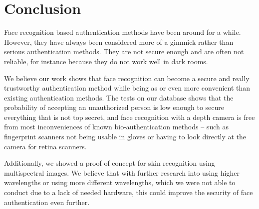 \chapter{Conclusion}
    Face recognition based authentication methods have been around for a while. However,
    they have always been considered more of a gimmick rather than serious
    authentication methods. They are not secure enough and are often not reliable,
    for instance because they do not work well in dark rooms.

    We believe our work shows that face recognition can become a secure and
    really trustworthy authentication method while being as or even more
    convenient than existing authentication methods.
    The tests on our database shows that the probability of accepting
    an unauthorized person is low enough to secure everything that is not top secret,
    and face recognition with a depth camera is free from most inconveniences
    of known bio-authentication methods -- such as fingerprint scanners not
    being usable in gloves or having to look directly at the camera for
    retina scanners.

    Additionally, we showed a proof of concept for skin recognition using
    multispectral images. We believe that with further research into
    using higher wavelengths or using more different wavelengths,
    which we were not able to conduct due to a lack of needed hardware,
    this could improve the security of face authentication even further.
